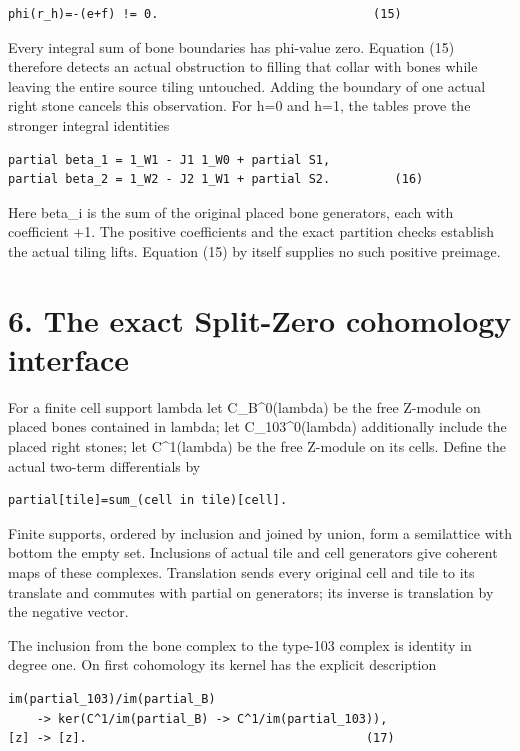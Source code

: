 \documentclass[
  10pt,
]{scrreprt}
\begin{document}
\begin{verbatim}
phi(r_h)=-(e+f) != 0.                              (15)
\end{verbatim}

Every integral sum of bone boundaries has phi-value zero. Equation (15)
therefore detects an actual obstruction to filling that collar with
bones while leaving the entire source tiling untouched. Adding the
boundary of one actual right stone cancels this observation. For h=0 and
h=1, the tables prove the stronger integral identities

\begin{verbatim}
partial beta_1 = 1_W1 - J1 1_W0 + partial S1,
partial beta_2 = 1_W2 - J2 1_W1 + partial S2.         (16)
\end{verbatim}

Here beta\_i is the sum of the original placed bone generators, each
with coefficient +1. The positive coefficients and the exact partition
checks establish the actual tiling lifts. Equation (15) by itself
supplies no such positive preimage.

\section{6. The exact Split-Zero cohomology
interface}\label{edition-4-section-10}

For a finite cell support lambda let C\_B\^{}0(lambda) be the free
Z-module on placed bones contained in lambda; let C\_103\^{}0(lambda)
additionally include the placed right stones; let C\^{}1(lambda) be the
free Z-module on its cells. Define the actual two-term differentials by

\begin{verbatim}
partial[tile]=sum_(cell in tile)[cell].
\end{verbatim}

Finite supports, ordered by inclusion and joined by union, form a
semilattice with bottom the empty set. Inclusions of actual tile and
cell generators give coherent maps of these complexes. Translation sends
every original cell and tile to its translate and commutes with partial
on generators; its inverse is translation by the negative vector.

The inclusion from the bone complex to the type-103 complex is identity
in degree one. On first cohomology its kernel has the explicit
description

\begin{verbatim}
im(partial_103)/im(partial_B)
    -> ker(C^1/im(partial_B) -> C^1/im(partial_103)),
[z] -> [z].                                       (17)
\end{verbatim}
\end{document}
